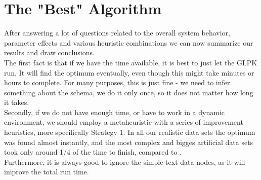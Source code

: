 \section{The "Best" Algorithm}

After answering a lot of questions related to the overall system behavior, parameter effects and various heuristic combinations we can now summarize our results and draw conclusions.\\

The first fact is that if we have the time available, it is best to just let the GLPK run. It will find the optimum eventually, even though this might take minutes or hours to complete. For many purposes, this is just fine - we need to infer something about the schema, we do it only once, so it does not matter how long it takes.\\

Secondly, if we do not have enough time, or have to work in a dynamic environment, we should employ a metaheuristic with a series of improvement heuristics, more specifically Strategy 1. In all our realistic data sets the optimum was found almost instantly, and the most complex and bigges artificial data sets took only around 1/4 of the time to finish, compared to .\\

Furthermore, it is always good to ignore the simple text data nodes, as it will improve the total run time.
